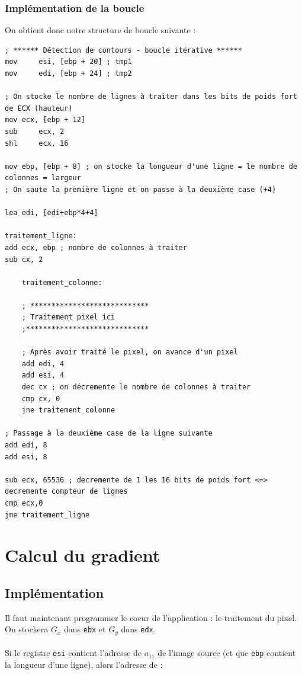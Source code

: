 \subsubsection{Implémentation de la boucle}

On obtient donc notre structure de boucle suivante :
\begin{lstlisting}[language={[x86masm]Assembler}]
; ****** Détection de contours - boucle itérative ******
mov     esi, [ebp + 20] ; tmp1
mov     edi, [ebp + 24] ; tmp2

; On stocke le nombre de lignes à traiter dans les bits de poids fort de ECX (hauteur)
mov ecx, [ebp + 12]
sub     ecx, 2
shl     ecx, 16

mov ebp, [ebp + 8] ; on stocke la longueur d'une ligne = le nombre de colonnes = largeur
; On saute la première ligne et on passe à la deuxième case (+4)

lea edi, [edi+ebp*4+4]

traitement_ligne:
add ecx, ebp ; nombre de colonnes à traiter
sub cx, 2

    traitement_colonne:
    
    ; ****************************
    ; Traitement pixel ici
    ;*****************************

    ; Après avoir traité le pixel, on avance d'un pixel
    add edi, 4
    add esi, 4
    dec cx ; on décremente le nombre de colonnes à traiter
    cmp cx, 0
    jne traitement_colonne

; Passage à la deuxième case de la ligne suivante
add edi, 8
add esi, 8

sub ecx, 65536 ; decremente de 1 les 16 bits de poids fort <=> decremente compteur de lignes
cmp ecx,0
jne traitement_ligne
\end{lstlisting}

\section{Calcul du gradient}
\subsection{Implémentation}
Il faut maintenant programmer le coeur de l'application : le traitement du pixel. On stockera $G_x$ dans \lstinline{ebx} et $G_y$ dans \lstinline{edx}.
\paragraph{}
Si le registre \lstinline{esi} contient l'adresse de $a_{11}$ de l'image source (et que \lstinline{ebp} contient la longueur d'une  ligne), alors l'adresse de :

